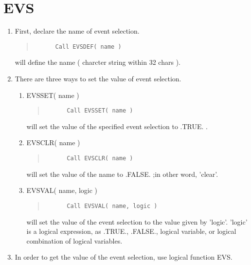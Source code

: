 \chapter{EVS}\label{sec:EVS}
\begin{enumerate}
\item First, declare the name of event selection.                   
\begin{quote}\baselineskip 3.2mm\begin{verbatim}
      Call EVSDEF( name )
\end{verbatim}\end{quote}
will define the name ( charcter string within 32 chars ).      
\item There are three ways to set the value of event selection.      
\begin{enumerate}
\item EVSSET( name )                                              
\begin{quote}\baselineskip 3.2mm\begin{verbatim}
      Call EVSSET( name )                                          
\end{verbatim}\end{quote}
will set the value of the specified event selection to .TRUE. .
\item EVSCLR( name )                                               
\begin{quote}\baselineskip 3.2mm\begin{verbatim}
      Call EVSCLR( name )
\end{verbatim}\end{quote}
will set the value of the name to .FALSE. ;in other word, 'clear'.
\item EVSVAL( name, logic )
\begin{quote}\baselineskip 3.2mm\begin{verbatim}
      Call EVSVAL( name, logic )                                   
\end{verbatim}\end{quote}
will set the value of the event selection to the value
given by 'logic'. 'logic' is a logical expression, as
.TRUE., .FALSE., logical variable, or logical
combination of logical variables.                            
\end{enumerate}
\item In order to get the value of the event selection, use
logical function EVS.                                          
\begin{quote}\baselineskip 3.2mm\begin{verbatim}

\end{verbatim}
\end{quote}
\end{enumerate}
